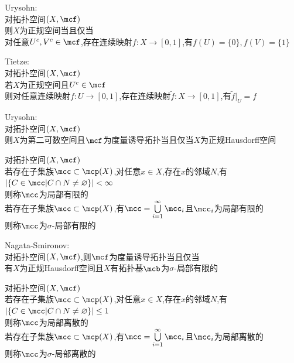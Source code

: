 \begin{dingli}
Urysohn:\\
对拓扑空间$(X,\mcf)$\\
则$X$为正规空间当且仅当\\
对任意$U^{c},V^{c}\in\mcf$,存在连续映射$f:X\to[0,1]$,有$f(U)=\{0\},f(V)=\{1\}$
\end{dingli}

\begin{dingli}
Tietze:\\
对拓扑空间$(X,\mcf)$\\
若$X$为正规空间且$U^{c}\in\mcf$\\
则对任意连续映射$f:U\to[0,1]$,存在连续映射$\widetilde{f}:X\to[0,1]$,有$\widetilde{f}|_{U}=f$
\end{dingli}

\begin{dingli}
Urysohn:\\
对拓扑空间$(X,\mcf)$\\
则$X$为第二可数空间且$\mcf$为度量诱导拓扑当且仅当$X$为正规Hausdorff空间
\end{dingli}

\begin{dingyi}
对拓扑空间$(X,\mcf)$\\
若存在子集族$\mcc\subset\mcp(X)$,对任意$x\in X$,存在$x$的邻域$N$,有$|\{C\in\mcc|C\cap N\neq\varnothing\}|<\infty$\\
则称$\mcc$为局部有限的\\
若存在子集族$\mcc\subset\mcp(X)$,有$\mcc=\bigcup\limits_{i=1}^{\infty}\mcc_{i}$且$\mcc_{i}$为局部有限的\\
则称$\mcc$为$\sigma$-局部有限的
\end{dingyi}

\begin{dingli}
Nagata-Smironov:\\
对拓扑空间$(X,\mcf)$,则$\mcf$为度量诱导拓扑当且仅当\\
有$X$为正规Hausdorff空间且$X$有拓扑基$\mcb$为$\sigma$-局部有限的
\end{dingli}

\begin{dingyi}
对拓扑空间$(X,\mcf)$\\
若存在子集族$\mcc\subset\mcp(X)$,对任意$x\in X$,存在$x$的邻域$N$,有$|\{C\in\mcc|C\cap N\neq\varnothing\}|\leq1$\\
则称$\mcc$为局部离散的\\
若存在子集族$\mcc\subset\mcp(X)$,有$\mcc=\bigcup\limits_{i=1}^{\infty}\mcc_{i}$且$\mcc_{i}$为局部离散的\\
则称$\mcc$为$\sigma$-局部离散的
\end{dingyi}

